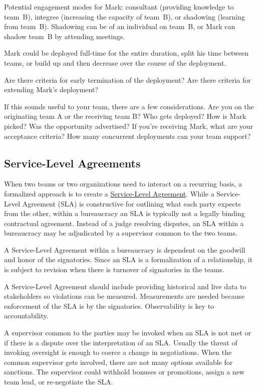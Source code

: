 Potential engagement modes for Mark: consultant (providing knowledge to team~B), integree (increasing the capacity of team~B), or shadowing (learning from team~B). Shadowing can be of an individual on team~B, or Mark can shadow team~B by attending meetings. 


Mark could be deployed full-time for the entire duration, split his time between teams, or build up and then decrease over the course of the deployment.

Are there criteria for early termination of the deployment? Are there criteria for extending Mark's deployment?

If this sounds useful to your team, there are a few considerations. Are you on the originating team A or the receiving team B? Who gets deployed? How is Mark picked? Was the opportunity advertised? If you're receiving Mark, what are your acceptance criteria? How many concurrent deployments can your team support?


\subsection*{Service-Level Agreements\label{sec:sla}}

When two teams or two organizations need to interact on a recurring basis, a formalized approach is to create a \href{https://en.wikipedia.org/wiki/Service-level_agreement}{Service-Level Agreement}. 
While a Service-Level Agreement (SLA) is constructive for outlining what each party expects from the other, within a bureaucracy an SLA is typically not a legally binding contractual agreement. Instead of a judge resolving disputes, an SLA within a bureaucracy may be adjudicated by a supervisor common to the two teams.

A Service-Level Agreement within a bureaucracy is dependent on the goodwill and honor of the signatories. Since an SLA is a formalization of a relationship, it is subject to revision when there is turnover of signatories in the teams. 

A Service-Level Agreement should include providing historical and live data to stakeholders so violations can be measured. Measurements are needed because enforcement of the SLA is by the signatories. Observability is key to accountability. 

A supervisor common to the parties may be invoked when an SLA is not met or if there is a dispute over the interpretation of an SLA. Usually the threat of invoking oversight is enough to coerce a change in negotiations. 
When the common supervisor gets involved, there are not many options available for sanctions. The supervisor could withhold bonuses or promotions,  assign a new team lead, or re-negotiate the SLA. 

